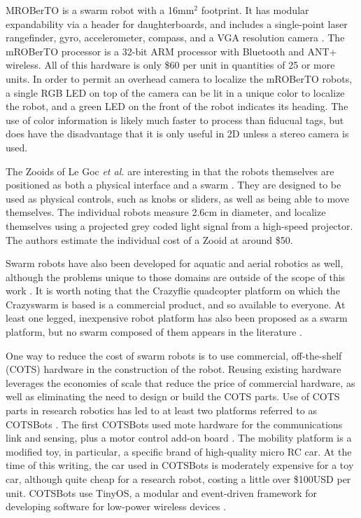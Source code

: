 MROBerTO is a swarm robot with a 16mm$^2$ footprint. It has modular expandability via a header for daughterboards, and includes a single-point laser rangefinder, gyro, accelerometer, compass, and a VGA resolution camera \citep{Kim2016mROBerTOAM}. 
The mROBerTO processor is a 32-bit ARM processor with Bluetooth and ANT+ wireless. 
All of this hardware is only \$60 per unit in quantities of 25 or more units. 
In order to permit an overhead camera to localize the mROBerTO robots, a single RGB LED on top of the camera can be lit in a unique color to localize the robot, and a green LED on the front of the robot indicates its heading. 
The use of color information is likely much faster to process than fiducual tags, but does have the disadvantage that it is only useful in 2D unless a stereo camera is used. 

The Zooids of Le Goc \emph{et al.} are interesting in that the robots themselves are positioned as both a physical interface and a swarm \citep{le2016zooids}. 
They are designed to be used as physical controls, such as knobs or sliders, as well as being able to move themselves.
The individual robots measure 2.6cm in diameter, and localize themselves using a projected grey coded light signal from a high-speed projector. 
The authors estimate the individual cost of a Zooid at around \$50. 

Swarm robots have also been developed for aquatic and aerial robotics as well, although the problems unique to those domains are outside of the scope of this work \citep{costa2016design, preiss2017crazyswarm}. 
It is worth noting that the Crazyflie quadcopter platform on which the Crazyswarm is based is a commercial product, and so available to everyone. 
At least one legged, inexpensive robot platform has also been proposed as a swarm platform, but no swarm composed of them appears in the literature \citep{kalat2015tribot}. 

One way to reduce the cost of swarm robots is to use commercial, off-the-shelf (COTS) hardware in the construction of the robot. 
Reusing existing hardware leverages the economies of scale that reduce the price of commercial hardware, as well as eliminating the need to design or build the COTS parts. 
Use of COTS parts in research robotics has led to at least two platforms referred to as COTSBots \citep{bergbreiter2003cotsbots, soule2011cotsbots}.
The first COTSBots used mote hardware for the communications link and sensing, plus a motor control add-on board \citep{bergbreiter2003cotsbots}. 
The mobility platform is a modified toy, in particular, a specific brand of high-quality micro RC car.
At the time of this writing, the car used in COTSBots is moderately expensive for a toy car, although quite cheap for a research robot, costing a little over \$100USD per unit. 
COTSBots use TinyOS, a modular and event-driven framework for developing software for low-power wireless devices \citep{levis2005tinyos}. 


